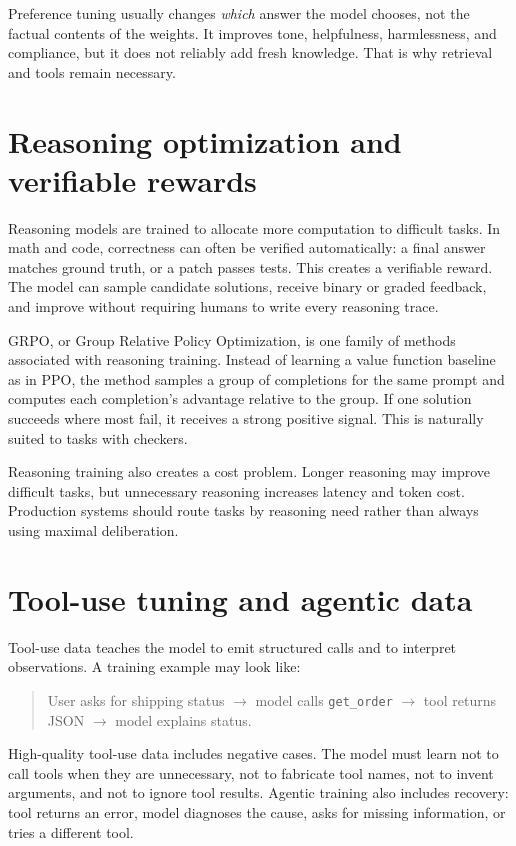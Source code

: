 Preference tuning usually changes \emph{which} answer the model chooses, not the factual contents of the weights. It improves tone, helpfulness, harmlessness, and compliance, but it does not reliably add fresh knowledge. That is why retrieval and tools remain necessary.

\section{Reasoning optimization and verifiable rewards}

Reasoning models are trained to allocate more computation to difficult tasks. In math and code, correctness can often be verified automatically: a final answer matches ground truth, or a patch passes tests. This creates a verifiable reward. The model can sample candidate solutions, receive binary or graded feedback, and improve without requiring humans to write every reasoning trace.

GRPO, or Group Relative Policy Optimization, is one family of methods associated with reasoning training. Instead of learning a value function baseline as in PPO, the method samples a group of completions for the same prompt and computes each completion's advantage relative to the group. If one solution succeeds where most fail, it receives a strong positive signal. This is naturally suited to tasks with checkers.

Reasoning training also creates a cost problem. Longer reasoning may improve difficult tasks, but unnecessary reasoning increases latency and token cost. Production systems should route tasks by reasoning need rather than always using maximal deliberation.

\section{Tool-use tuning and agentic data}

Tool-use data teaches the model to emit structured calls and to interpret observations. A training example may look like:

\begin{quote}
User asks for shipping status $\rightarrow$ model calls \texttt{get\_order} $\rightarrow$ tool returns JSON $\rightarrow$ model explains status.
\end{quote}

High-quality tool-use data includes negative cases. The model must learn not to call tools when they are unnecessary, not to fabricate tool names, not to invent arguments, and not to ignore tool results. Agentic training also includes recovery: tool returns an error, model diagnoses the cause, asks for missing information, or tries a different tool.

